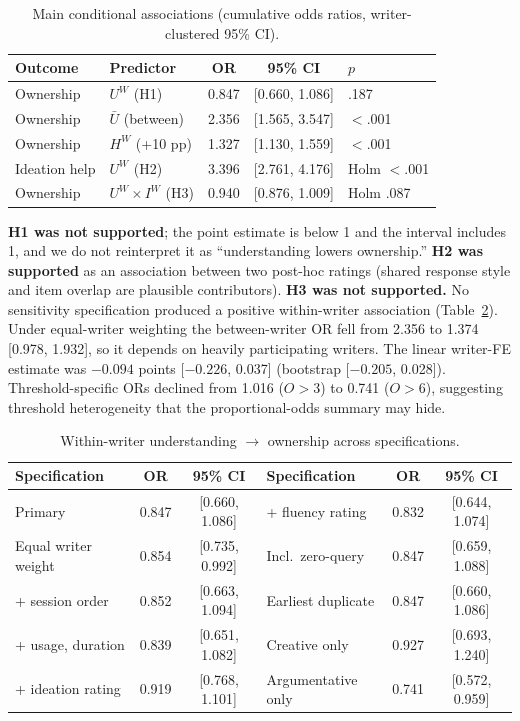 \documentclass[10pt]{article}
\begin{document}
\begin{table}[h]
\centering\small
\caption{Main conditional associations (cumulative odds ratios, writer-clustered 95\% CI).}\label{tab:main}
\begin{tabular}{llccl}
\toprule
Outcome & Predictor & OR & 95\% CI & $p$ \\
\midrule
Ownership & $U^W$ (H1) & 0.847 & [0.660, 1.086] & .187 \\
Ownership & $\bar U$ (between) & 2.356 & [1.565, 3.547] & $<$.001 \\
Ownership & $H^W$ (+10 pp) & 1.327 & [1.130, 1.559] & $<$.001 \\
Ideation help & $U^W$ (H2) & 3.396 & [2.761, 4.176] & Holm $<$.001 \\
Ownership & $U^W\times I^W$ (H3) & 0.940 & [0.876, 1.009] & Holm .087 \\
\bottomrule
\end{tabular}
\end{table}

\textbf{H1 was not supported}; the point estimate is below 1 and the interval includes 1, and we do not reinterpret it as ``understanding lowers ownership.''
\textbf{H2 was supported} as an association between two post-hoc ratings (shared response style and item overlap are plausible contributors). \textbf{H3 was not supported.}
No sensitivity specification produced a positive within-writer association (Table~\ref{tab:sens}). Under equal-writer weighting the between-writer OR fell from 2.356 to 1.374 [0.978, 1.932], so it depends on heavily participating writers. The linear writer-FE estimate was $-0.094$ points [$-0.226$, 0.037] (bootstrap [$-0.205$, 0.028]). Threshold-specific ORs declined from 1.016 ($O>3$) to 0.741 ($O>6$), suggesting threshold heterogeneity that the proportional-odds summary may hide.

\begin{table}[h]
\centering\small
\caption{Within-writer understanding $\to$ ownership across specifications.}\label{tab:sens}
\begin{tabular}{lcc@{\qquad}lcc}
\toprule
Specification & OR & 95\% CI & Specification & OR & 95\% CI\\
\midrule
Primary & 0.847 & [0.660, 1.086] & + fluency rating & 0.832 & [0.644, 1.074]\\
Equal writer weight & 0.854 & [0.735, 0.992] & Incl.\ zero-query & 0.847 & [0.659, 1.088]\\
+ session order & 0.852 & [0.663, 1.094] & Earliest duplicate & 0.847 & [0.660, 1.086]\\
+ usage, duration & 0.839 & [0.651, 1.082] & Creative only & 0.927 & [0.693, 1.240]\\
+ ideation rating & 0.919 & [0.768, 1.101] & Argumentative only & 0.741 & [0.572, 0.959]\\
\bottomrule
\end{tabular}
\end{table}
\end{document}
